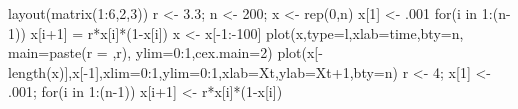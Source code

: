 \documentclass[
  a4paper,
  DIV=11,
  numbers=noendperiod,
  oneside]{scrreprt}
\newenvironment{Shaded}{}{}
\newcommand{\AttributeTok}[1]{\textcolor[rgb]{0.84,0.23,0.29}{#1}}
\newcommand{\ControlFlowTok}[1]{\textcolor[rgb]{0.84,0.23,0.29}{#1}}
\newcommand{\DecValTok}[1]{\textcolor[rgb]{0.00,0.36,0.77}{#1}}
\newcommand{\FloatTok}[1]{\textcolor[rgb]{0.00,0.36,0.77}{#1}}
\newcommand{\FunctionTok}[1]{\textcolor[rgb]{0.44,0.26,0.76}{#1}}
\newcommand{\NormalTok}[1]{\textcolor[rgb]{0.14,0.16,0.18}{#1}}
\newcommand{\OtherTok}[1]{\textcolor[rgb]{0.44,0.26,0.76}{#1}}
\newcommand{\SpecialCharTok}[1]{\textcolor[rgb]{0.00,0.36,0.77}{#1}}
\newcommand{\StringTok}[1]{\textcolor[rgb]{0.01,0.18,0.38}{#1}}
\begin{document}
\begin{Shaded}
\begin{Highlighting}[]
\FunctionTok{layout}\NormalTok{(}\FunctionTok{matrix}\NormalTok{(}\DecValTok{1}\SpecialCharTok{:}\DecValTok{6}\NormalTok{,}\DecValTok{2}\NormalTok{,}\DecValTok{3}\NormalTok{))}
\NormalTok{r }\OtherTok{\textless{}{-}} \FloatTok{3.3}\NormalTok{; n }\OtherTok{\textless{}{-}} \DecValTok{200}\NormalTok{; x }\OtherTok{\textless{}{-}} \FunctionTok{rep}\NormalTok{(}\DecValTok{0}\NormalTok{,n)}
\NormalTok{x[}\DecValTok{1}\NormalTok{] }\OtherTok{\textless{}{-}}\NormalTok{ .}\DecValTok{001}
\ControlFlowTok{for}\NormalTok{(i }\ControlFlowTok{in} \DecValTok{1}\SpecialCharTok{:}\NormalTok{(n}\DecValTok{{-}1}\NormalTok{)) x[i}\SpecialCharTok{+}\DecValTok{1}\NormalTok{] }\OtherTok{=}\NormalTok{ r}\SpecialCharTok{*}\NormalTok{x[i]}\SpecialCharTok{*}\NormalTok{(}\DecValTok{1}\SpecialCharTok{{-}}\NormalTok{x[i])}
\NormalTok{x }\OtherTok{\textless{}{-}}\NormalTok{ x[}\SpecialCharTok{{-}}\DecValTok{1}\SpecialCharTok{:{-}}\DecValTok{100}\NormalTok{]}
\FunctionTok{plot}\NormalTok{(x,}\AttributeTok{type=}\StringTok{\textquotesingle{}l\textquotesingle{}}\NormalTok{,}\AttributeTok{xlab=}\StringTok{\textquotesingle{}time\textquotesingle{}}\NormalTok{,}\AttributeTok{bty=}\StringTok{\textquotesingle{}n\textquotesingle{}}\NormalTok{, }\AttributeTok{main=}\FunctionTok{paste}\NormalTok{(}\StringTok{\textquotesingle{}r = \textquotesingle{}}\NormalTok{,r),}
     \AttributeTok{ylim=}\DecValTok{0}\SpecialCharTok{:}\DecValTok{1}\NormalTok{,}\AttributeTok{cex.main=}\DecValTok{2}\NormalTok{) }
\FunctionTok{plot}\NormalTok{(x[}\SpecialCharTok{{-}}\FunctionTok{length}\NormalTok{(x)],x[}\SpecialCharTok{{-}}\DecValTok{1}\NormalTok{],}\AttributeTok{xlim=}\DecValTok{0}\SpecialCharTok{:}\DecValTok{1}\NormalTok{,}\AttributeTok{ylim=}\DecValTok{0}\SpecialCharTok{:}\DecValTok{1}\NormalTok{,}\AttributeTok{xlab=}\StringTok{\textquotesingle{}Xt\textquotesingle{}}\NormalTok{,}\AttributeTok{ylab=}\StringTok{\textquotesingle{}Xt+1\textquotesingle{}}\NormalTok{,}\AttributeTok{bty=}\StringTok{\textquotesingle{}n\textquotesingle{}}\NormalTok{)}
\NormalTok{r }\OtherTok{\textless{}{-}} \DecValTok{4}\NormalTok{; x[}\DecValTok{1}\NormalTok{] }\OtherTok{\textless{}{-}}\NormalTok{ .}\DecValTok{001}\NormalTok{;}
\ControlFlowTok{for}\NormalTok{(i }\ControlFlowTok{in} \DecValTok{1}\SpecialCharTok{:}\NormalTok{(n}\DecValTok{{-}1}\NormalTok{)) x[i}\SpecialCharTok{+}\DecValTok{1}\NormalTok{] }\OtherTok{\textless{}{-}}\NormalTok{ r}\SpecialCharTok{*}\NormalTok{x[i]}\SpecialCharTok{*}\NormalTok{(}\DecValTok{1}\SpecialCharTok{{-}}\NormalTok{x[i])}

\end{Highlighting}
\end{Shaded}
\end{document}
